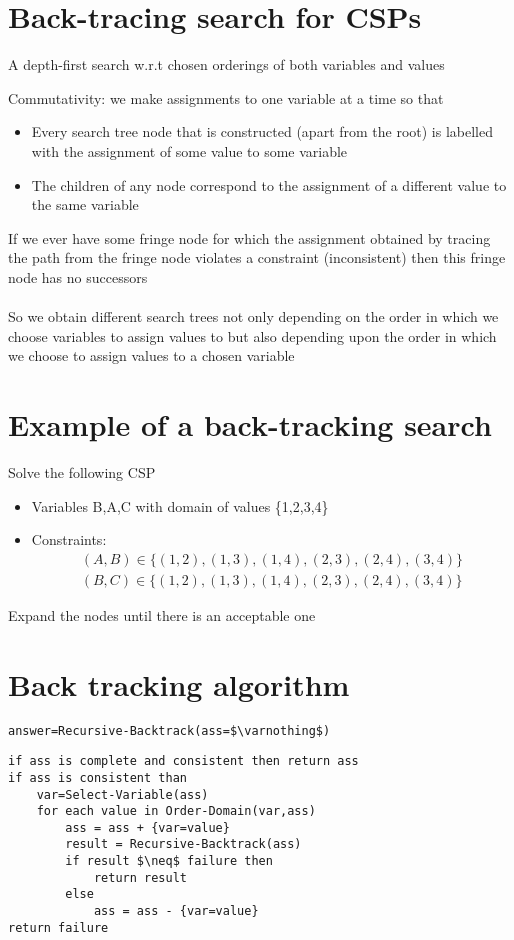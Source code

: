 \documentclass{article}[18pt]
\begin{document}
\section{Back-tracing search for CSPs}
\begin{defin}
A depth-first search w.r.t chosen orderings of both variables and values
\end{defin}
Commutativity: we make assignments to one variable at a time so that
\begin{itemize}
	\item Every search tree node that is constructed (apart from the root) is labelled with the assignment of some value to some variable
	\item The children of any node correspond to the assignment of a different value to the same variable
\end{itemize}
If we ever have some fringe node for which the assignment obtained by tracing the path from the fringe node violates a constraint (inconsistent) then this fringe node has no successors\\
\\
So we obtain different search trees not only depending on the order in which we choose variables to assign values to but also depending upon the order in which we choose to assign values to a chosen variable
\section{Example of a back-tracking search}
Solve the following CSP
\begin{itemize}
	\item Variables B,A,C with domain of values \{1,2,3,4\}
	\item Constraints:
\[
\begin{array}{l}{(A, B) \in\{(1,2),(1,3),(1,4),(2,3),(2,4),(3,4)\}} \\ {(B, C) \in\{(1,2),(1,3),(1,4),(2,3),(2,4),(3,4)\}}\end{array}
\]
\end{itemize}
Expand the nodes until there is an acceptable one
\section{Back tracking algorithm}
\begin{lstlisting}[caption=Backtrack-Search(CSP)]
answer=Recursive-Backtrack(ass=$\varnothing$)
\end{lstlisting}
\begin{lstlisting}[caption=Recursive-Backtrack(ass)]
if ass is complete and consistent then return ass
if ass is consistent than
	var=Select-Variable(ass)
	for each value in Order-Domain(var,ass)
		ass = ass + {var=value}
		result = Recursive-Backtrack(ass)
		if result $\neq$ failure then
			return result
		else
			ass = ass - {var=value}
return failure
\end{lstlisting}
\end{document}

